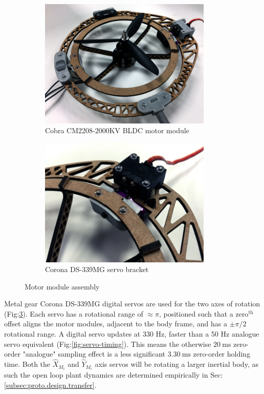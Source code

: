 \begin{figure}[htbp]
\centering
\begin{subfigure}{0.49\textwidth}
\centering
\includegraphics[width=0.9\textwidth]{figs/motor-bldc}
\caption{Cobra CM2208-2000KV BLDC motor module}
\label{fig:bldc-motor}
\end{subfigure}
\begin{subfigure}{0.49\textwidth}
\centering
\includegraphics[width=0.9\textwidth]{figs/motor-servo}
\caption{Corona DS-339MG servo bracket}
\label{fig:motor-servo}
\end{subfigure}
\vspace{-5pt}
\caption{Motor module assembly}
\vspace{-15pt}
\end{figure}
\par
Metal gear Corona DS-339MG digital servos are used for the two axes of rotation (Fig:\ref{fig:motor-servo}). Each servo has a rotational range of $\approx\pi$, positioned such that a $\text{zero}^{\text{th}}$ offset aligns the motor modules, adjacent to the body frame, and has a $\pm\pi/2$ rotational range. A digital servo updates at 330 Hz, faster than a 50 Hz analogue servo equivalent (Fig:\ref{fig:servo-timing}). This means the otherwise $20~\text{ms}$ zero-order "analogue" sampling effect is a less significant $3.30~\text{ms}$ zero-order holding time. Both the $\hat{X}_{M_i}$ and $\hat{Y}_{M_i}$ axis servos will be rotating a larger inertial body, as such the open loop plant dynamics are determined empirically in Sec:\ref{subsec:proto.design.transfer}.

